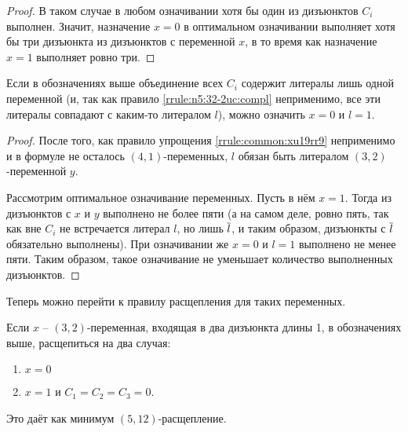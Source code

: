 \begin{proof}
 В таком случае в любом означивании хотя бы один из дизъюнктов $C_i$ выполнен. Значит, назначение $x = 0$ в оптимальном означивании выполняет хотя бы три дизъюнкта из дизъюнктов с переменной $x$, в то время как назначение $x = 1$ выполняет ровно три.
\end{proof}

\begin{rrule}
 Если в обозначениях выше объединение всех $C_i$ содержит литералы лишь одной переменной (и, так как правило \ref{rrule:n5:32-2uc:compl} неприменимо, все эти литералы совпадают с каким-то литералом $l$), можно означить $x = 0$ и $l = 1$.
 \label{rrule:n5:32-2uc:same}
\end{rrule}

\begin{proof}
 После того, как правило упрощения \ref{rrule:common:xu19rr9} неприменимо и в формуле не осталось $(4,1)$-переменных, $l$ обязан быть литералом $(3,2)$-переменной $y$.

 Рассмотрим оптимальное означивание переменных. Пусть в нём $x = 1$. Тогда из дизъюнктов с $x$ и $y$ выполнено не более пяти (а на самом деле, ровно пять, так как вне $C_i$ не встречается литерал $l$, но лишь $\overline{l}$, и таким образом, дизъюнкты с $\overline{l}$ обязательно выполнены). При означивании же $x = 0$ и $l = 1$ выполнено не менее пяти. Таким образом, такое означивание не уменьшает количество выполненных дизъюнктов.
\end{proof}

Теперь можно перейти к правилу расщепления для таких переменных.

\begin{brule}
 Если $x$ -- $(3,2)$-переменная, входящая в два дизъюнкта длины 1, в обозначениях выше, расщепиться на два случая:
 \begin{enumerate}
  \item $x = 0$
  \item $x = 1$ и $C_1 = C_2 = C_3 = 0$.
 \end{enumerate}

 Это даёт как минимум $(5,12)$-расщепление.
 \label{brule:n5:32-2uc}
\end{brule}

